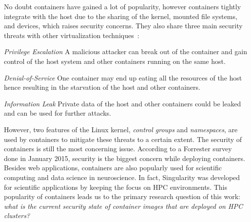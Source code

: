 \documentclass[a4paper,num-refs]{oup-contemporary}
\begin{document}
No doubt containers have gained a lot of popularity, however containers tightly
integrate with the host due to the sharing of the kernel, 
mounted file systems, and devices, which raises security
concerns.
They also share three main security threats with other virtualization
techniques~\cite{gantikow2016providing}:

\textit{Privilege Escalation} A malicious attacker can break out of the container
and gain control of the host system and other containers running on the same host.

\textit{Denial-of-Service} One container may end up eating all the resources of the
host hence resulting in the starvation of the host and other containers.

\textit{Information Leak} Private data of the host and other containers could be
leaked and can be used for further attacks.


However, two features of the Linux kernel, \textit{control groups} and \textit{namespaces},
are used by containers to mitigate these threats to a certain extent. The security
of containers is still the most concerning issue. According to a Forrester survey~\cite{bettini2015vulnerability}
done in January 2015, security is the
biggest concern while deploying containers.
Besides web applications, containers are also popularly used for scientific computing
and data science in neuroscience. In fact, Singularity was developed for scientific applications
by keeping the focus on HPC environments. This popularity of containers leads us to the
primary research question of this work: \textit{what is the current security state of
container images that are deployed on HPC clusters?}
\end{document}
